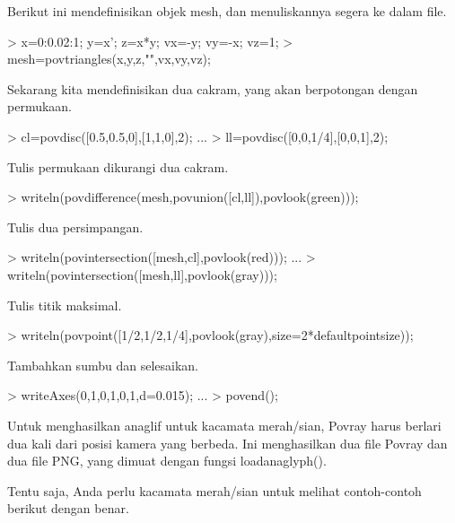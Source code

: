\documentclass[a4paper,10pt]{article}
\begin{document}
\begin{eulernotebook}
\begin{eulercomment}
\begin{eulercomment}
\begin{eulercomment}
Berikut ini mendefinisikan objek mesh, dan menuliskannya segera ke
dalam file.
\end{eulercomment}
\begin{eulerprompt}
> x=0:0.02:1; y=x'; z=x*y; vx=-y; vy=-x; vz=1;
> mesh=povtriangles(x,y,z,"",vx,vy,vz);
\end{eulerprompt}
\begin{eulercomment}
Sekarang kita mendefinisikan dua cakram, yang akan berpotongan dengan
permukaan.
\end{eulercomment}
\begin{eulerprompt}
> cl=povdisc([0.5,0.5,0],[1,1,0],2); ...
> ll=povdisc([0,0,1/4],[0,0,1],2);
\end{eulerprompt}
\begin{eulercomment}
Tulis permukaan dikurangi dua cakram.
\end{eulercomment}
\begin{eulerprompt}
> writeln(povdifference(mesh,povunion([cl,ll]),povlook(green)));
\end{eulerprompt}
\begin{eulercomment}
Tulis dua persimpangan.
\end{eulercomment}
\begin{eulerprompt}
> writeln(povintersection([mesh,cl],povlook(red))); ...
> writeln(povintersection([mesh,ll],povlook(gray)));
\end{eulerprompt}
\begin{eulercomment}
Tulis titik maksimal.
\end{eulercomment}
\begin{eulerprompt}
> writeln(povpoint([1/2,1/2,1/4],povlook(gray),size=2*defaultpointsize));
\end{eulerprompt}
\begin{eulercomment}
Tambahkan sumbu dan selesaikan.
\end{eulercomment}
\begin{eulerprompt}
> writeAxes(0,1,0,1,0,1,d=0.015); ...
> povend();
\end{eulerprompt}
\begin{eulercomment}
Untuk menghasilkan anaglif untuk kacamata merah/sian, Povray harus
berlari dua kali dari posisi kamera yang berbeda. Ini menghasilkan dua
file Povray dan dua file PNG, yang dimuat dengan fungsi
loadanaglyph().

Tentu saja, Anda perlu kacamata merah/sian untuk melihat contoh-contoh
berikut dengan benar.


\end{eulercomment}
\end{eulercomment}
\end{eulercomment}
\end{eulernotebook}
\end{document}
